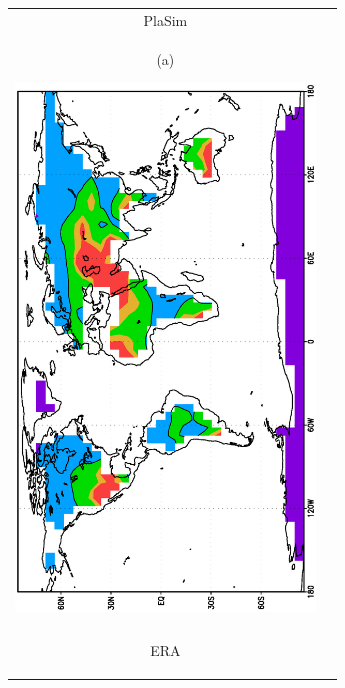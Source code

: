 \documentclass[12pt,a4paper,twoside,openright,headinclude,liststotoc,bibtotoc]{scrreprt}
\begin{document}
\begin{figure}[c]
\begin{tabular}{cc}
\hspace{-0.5cm}PlaSim 
\\
\begin{minipage}{1.0\textwidth}
\begin{center}
\begin{scriptsize}(a)\end{scriptsize}\hspace{-1cm}\includegraphics[height=14.0cm,angle=-90]{eps/budyko_PLAS_ANMnn.eps} 
\end{center}
\end{minipage}
\\
\\
\begin{minipage}{1.0\textwidth}\hspace{7.9cm}ERA\vspace{-0.6cm}
\begin{center}

\end{center}
\end{minipage}
\end{tabular}
\end{figure}
\end{document}
